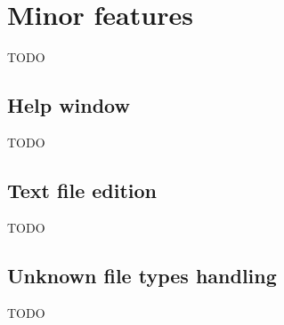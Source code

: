 \section{Minor features}\label{section:minor-features}

TODO


\subsection{Help window}\label{sub:minor-help}

TODO


\subsection{Text file edition}\label{sub:minor-txt}

TODO


\subsection{Unknown file types handling}\label{sub:minor-unknown}

TODO

\vfill\newpage
